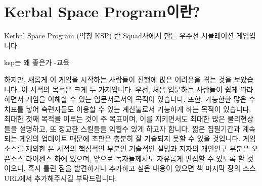 \chapter*{Kerbal Space Program이란?}
Kerbal Space Program (약칭 KSP) 란 Squad사에서 만든 우주선 시뮬레이션 게임입니다.


ksp는 왜 좋은가
-교육

하지만, 새롭게 이 게임을 시작하는 사람들이 진행에 많은 어려움을 겪는 것을 보았습니다. 이 서적의 목적은 크게 두 가지입니다. 
우선, 처음 입문하는 사람들이 쉽게 따라하면서 게임을 이해할 수 있는 입문서로서의 목적이 있습니다.
또한, 가능한한 많은 수치표를 넣어 숙련자들도 이용할 수 있는 계산툴로서 기능하게 하는 목적이 있습니다.
최대한 첫째 목적을 이루는 것이 주 목표이며, 이를 지키면서도 최대한 많은 물리현상들을 설명하고, 또 정교한 스킬들을 익힐수 있게 하고자 합니다.
짧은 집필기간과 계속되는 게임의 업데이트 때문에 초판은 충분히 잘 기술되지 못할 수 있을 것입니다.
게임소스를 제외한 본 서적의 핵심적인 부분인 기술적인 설명과 저자의 개인연구 부분은 오픈소스 라이센스 하에 있으며, 앞으로 독자들께서도 자유롭게 편집할 수 있도록 할 것이오니,
혹시 틀린 점을 발견하거나 추가하고 싶은 내용이 있으면 책 마지막 장의 소스 URL에서 추가해주시길 부탁드립니다.

